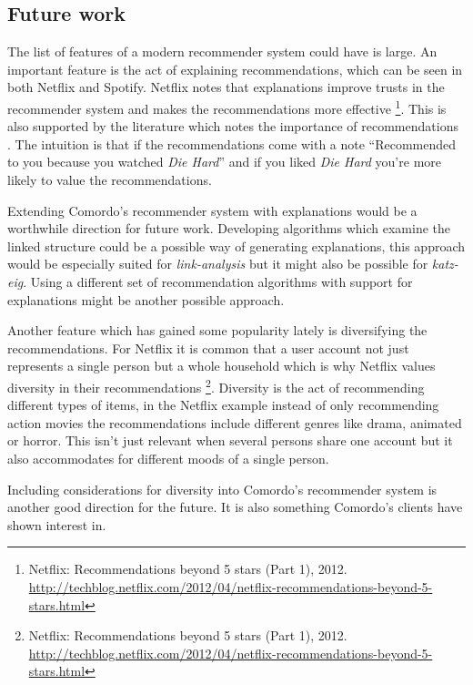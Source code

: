 
\subsection{Future work}\label{sec:disc:recsys:future}

The list of features of a modern recommender system could have is large. An important feature is the act of explaining recommendations, which can be seen in both Netflix and Spotify. Netflix notes that explanations improve trusts in the recommender system and makes the recommendations more effective \footnote{
Netflix: Recommendations beyond 5 stars (Part 1), 2012.
\url{http://techblog.netflix.com/2012/04/netflix-recommendations-beyond-5-stars.html}
}.
This is also supported by the literature which notes the importance of recommendations \citep{hu2008collaborative, tintarev2007survey}.
The intuition is that if the recommendations come with a note ``Recommended to you because you watched \textit{Die Hard}'' and if you liked \textit{Die Hard} you're more likely to value the recommendations.

Extending Comordo's recommender system with explanations would be a worthwhile direction for future work. Developing algorithms which examine the linked structure could be a possible way of generating explanations, this approach would be especially suited for \textit{link-analysis} but it might also be possible for \textit{katz-eig}. Using a different set of recommendation algorithms with support for explanations \citep{hu2008collaborative} might be another possible approach.

Another feature which has gained some popularity lately \citep{bobadilla2013recommender} is diversifying the recommendations. For Netflix it is common that a user account not just represents a single person but a whole household which is why Netflix values diversity in their recommendations
\footnote{
Netflix: Recommendations beyond 5 stars (Part 1), 2012.
\url{http://techblog.netflix.com/2012/04/netflix-recommendations-beyond-5-stars.html}
}.
Diversity is the act of recommending different types of items, in the Netflix example instead of only recommending action movies the recommendations include different genres like drama, animated or horror. This isn't just relevant when several persons share one account but it also accommodates for different moods of a single person.

Including considerations for diversity into Comordo's recommender system is another good direction for the future. It is also something Comordo's clients have shown interest in.

